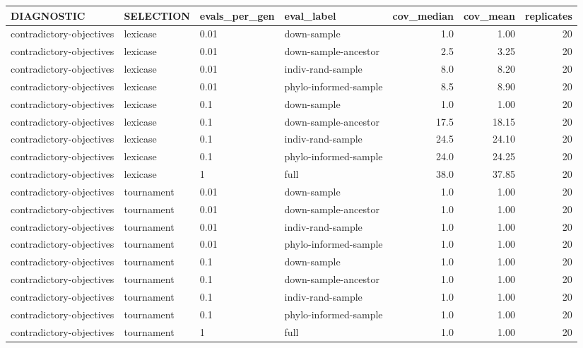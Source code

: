 \documentclass[
]{book}
\begin{document}
\begin{tabular}{l|l|l|l|r|r|r}
\hline
DIAGNOSTIC & SELECTION & evals\_per\_gen & eval\_label & cov\_median & cov\_mean & replicates\\
\hline
contradictory-objectives & lexicase & 0.01 & down-sample & 1.0 & 1.00 & 20\\
\hline
contradictory-objectives & lexicase & 0.01 & down-sample-ancestor & 2.5 & 3.25 & 20\\
\hline
contradictory-objectives & lexicase & 0.01 & indiv-rand-sample & 8.0 & 8.20 & 20\\
\hline
contradictory-objectives & lexicase & 0.01 & phylo-informed-sample & 8.5 & 8.90 & 20\\
\hline
contradictory-objectives & lexicase & 0.1 & down-sample & 1.0 & 1.00 & 20\\
\hline
contradictory-objectives & lexicase & 0.1 & down-sample-ancestor & 17.5 & 18.15 & 20\\
\hline
contradictory-objectives & lexicase & 0.1 & indiv-rand-sample & 24.5 & 24.10 & 20\\
\hline
contradictory-objectives & lexicase & 0.1 & phylo-informed-sample & 24.0 & 24.25 & 20\\
\hline
contradictory-objectives & lexicase & 1 & full & 38.0 & 37.85 & 20\\
\hline
contradictory-objectives & tournament & 0.01 & down-sample & 1.0 & 1.00 & 20\\
\hline
contradictory-objectives & tournament & 0.01 & down-sample-ancestor & 1.0 & 1.00 & 20\\
\hline
contradictory-objectives & tournament & 0.01 & indiv-rand-sample & 1.0 & 1.00 & 20\\
\hline
contradictory-objectives & tournament & 0.01 & phylo-informed-sample & 1.0 & 1.00 & 20\\
\hline
contradictory-objectives & tournament & 0.1 & down-sample & 1.0 & 1.00 & 20\\
\hline
contradictory-objectives & tournament & 0.1 & down-sample-ancestor & 1.0 & 1.00 & 20\\
\hline
contradictory-objectives & tournament & 0.1 & indiv-rand-sample & 1.0 & 1.00 & 20\\
\hline
contradictory-objectives & tournament & 0.1 & phylo-informed-sample & 1.0 & 1.00 & 20\\
\hline
contradictory-objectives & tournament & 1 & full & 1.0 & 1.00 & 20\\
\hline
\end{tabular}
\end{document}
